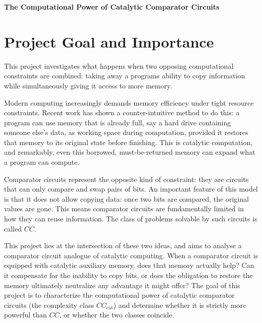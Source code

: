 \documentclass[12pt]{article}
\newcommand{\CCC}{CC_\text{cat}}
\begin{document}
\begin{center}
{\fontsize{14pt}{16pt}\selectfont \textbf{
The Computational Power of Catalytic Comparator Circuits}}
\end{center}

\section{Project Goal and Importance}

This project investigates what happens when two opposing computational constraints are combined: taking away a programs ability to copy information while simultaneously giving it access to more memory.


Modern computing increasingly demands memory efficiency under tight resource constraints. Recent work \autocite{BuhrmanEtAl2014} has shown a counter-intuitive method to do this: a program can use memory that is already full, say a hard drive containing someone else's data, as working space during computation, provided it restores that memory to its original state before finishing. This is catalytic computation, and remarkably, even this borrowed, must-be-returned memory can expand what a program can compute.

Comparator circuits \autocite{Subramanian1990} represent the opposite kind of constraint: they are circuits that can only compare and swap pairs of bits. An important feature of this model is that it does not allow copying data: once two bits are compared, the original values are gone. This means comparator circuits are fundamentally limited in how they can reuse information. The class of problems solvable by such circuits is called $CC$.


This project lies at the intersection of these two ideas, and aims to analyse a comparator circuit analogue of catalytic computing. When a comparator circuit is equipped with catalytic auxiliary memory, does that memory actually help? Can it compensate for the inability to copy bits, or does the obligation to restore the memory ultimately neutralize any advantage it might offer? The goal of this project is to characterize the computational power of catalytic comparator circuits (the complexity class $\CCC$) and determine whether it is strictly more powerful than $CC$, or whether the two  classes coincide. 
\end{document}
